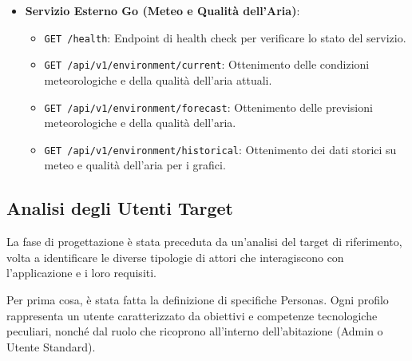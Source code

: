 \documentclass[a4paper,12pt]{article}
\begin{document}
\begin{itemize}
\begin{itemize}
        \item \texttt{PUT /api/v1/home/:id/rules/order}: Aggiornamento dell'ordine di valutazione delle automazioni.
        \item \texttt{DELETE /api/v1/home/:id/rules/:ruleId}: Eliminazione di una regola di automazione.
        \item \texttt{GET /api/v1/home/:id/notifications}: Ottenimento delle notifiche relative alla casa.
        \item \texttt{GET/PUT /api/v1/home/:homeId/users/me/preferences}: Visualizzazione o aggiornamento delle preferenze (es. ricezione notifiche) dell'utente corrente.
        \item \texttt{GET /api/v1/home/:id/users}: Ottenimento della lista degli utenti associati alla casa.
        \item \texttt{PUT /api/v1/home/:id/users/:userId/role}: Modifica dei privilegi (ruolo) di un utente specifico.
    \end{itemize}
    \item \textbf{Servizio Esterno Go (Meteo e Qualità dell'Aria)}:
    \begin{itemize}
        \item \texttt{GET /health}: Endpoint di health check per verificare lo stato del servizio.
        \item \texttt{GET /api/v1/environment/current}: Ottenimento delle condizioni meteorologiche e della qualità dell'aria attuali.
        \item \texttt{GET /api/v1/environment/forecast}: Ottenimento delle previsioni meteorologiche e della qualità dell'aria.
        \item \texttt{GET /api/v1/environment/historical}: Ottenimento dei dati storici su meteo e qualità dell'aria per i grafici.
    \end{itemize}
\end{itemize}

\subsection{Analisi degli Utenti Target}
La fase di progettazione è stata preceduta da un'analisi del target di riferimento, volta a identificare le diverse tipologie di attori che interagiscono con l'applicazione e i loro requisiti.

Per prima cosa, è stata fatta la definizione di specifiche Personas. Ogni profilo rappresenta un utente caratterizzato da obiettivi e competenze tecnologiche peculiari, nonché dal ruolo che ricoprono all'interno dell'abitazione (Admin o Utente Standard).
\end{document}
